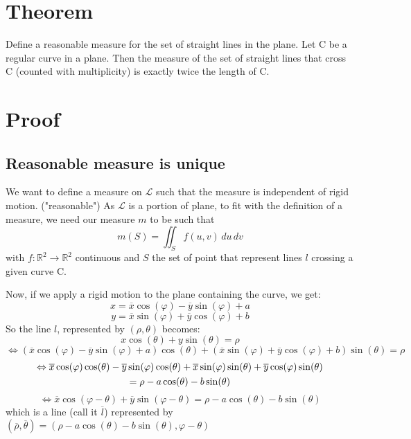 \documentclass[a4paper]{article}
\begin{document}
\section{Theorem}
Define a reasonable measure for the set of straight lines in the plane.
Let C be a regular curve in a plane. Then the measure of the set of straight lines that cross C (counted with multiplicity) is exactly twice the length of C.





\section{Proof}
\subsection{Reasonable measure is unique}
We want to define a measure on $\mathscr{L}$ such that the measure is independent of rigid motion. ("reasonable")
\smallbreak
As $\mathscr{L}$ is a portion of plane, to fit with the definition of a measure, we need our measure $m$ to be such that
$$m(S)=\iint_S f(u,v) \,du\,dv$$
with $f:\mathbb{R}^2 \to  \mathbb{R}^2$ continuous and $S$ the set of point that represent lines $l$ crossing a given curve C.
\bigbreak

Now, if we apply a rigid motion to the plane containing the curve, we get:
$$x=\overline{x} \cos (\varphi) - \overline{y} \sin (\varphi) + a$$
$$y=\overline{x} \sin (\varphi) + \overline{y} \cos (\varphi) + b$$
So the line $l$, represented by $(\rho, \theta)$ becomes:
$$x\cos(\theta) + y\sin(\theta) = \rho$$
$$\Leftrightarrow (\overline{x} \cos (\varphi) - \overline{y} \sin (\varphi) + a) \cos(\theta) + (\overline{x} \sin (\varphi) + \overline{y} \cos (\varphi) + b) \sin(\theta) = \rho$$
\begin{multline}
\Leftrightarrow \overline{x} \cos (\varphi) \cos(\theta) - \overline{y} \sin (\varphi) \cos(\theta) + \overline{x} \sin (\varphi) \sin(\theta) + \overline{y} \cos (\varphi) \sin(\theta) \\
= \rho - a \cos(\theta) - b \sin(\theta)$$
\end{multline}
$$\Leftrightarrow \overline{x} \cos (\varphi - \theta) + \overline{y} \sin (\varphi - \theta)  = \rho - a \cos(\theta) - b \sin(\theta)$$
which is a line (call it $\overline{l}$) represented by $(\overline{\rho}, \overline{\theta}) = (\rho - a \cos(\theta) - b \sin(\theta), \varphi - \theta)$
\bigbreak
\end{document}
